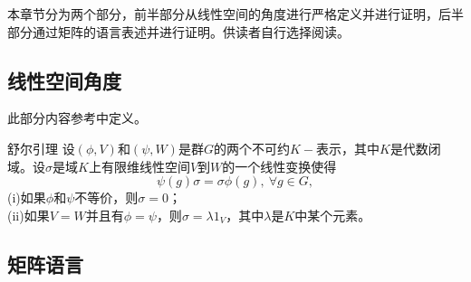 
\begin{issues}
\issueDraft
\issueNeedCite
\issueTODO
\issueMissDepend
\end{issues}


本章节分为两个部分，前半部分从线性空间的角度进行严格定义并进行证明，后半部分通过矩阵的语言表述并进行证明。供读者自行选择阅读。

\subsection{线性空间角度}

此部分内容参考\cite{维声表示}中定义。

\begin{lemma}{舒尔引理}
设$(\phi,V)$和$(\psi,W)$是群$G$的两个不可约$K-$表示，其中$K$是代数闭域。设$\sigma$是域$K$上有限维线性空间$V$到$W$的一个线性变换使得
\begin{equation}\label{eq_Schlem_1}
\psi(g)\sigma =\sigma \phi(g),~\forall g \in G,
\end{equation}
(i)如果$\phi$和$\psi$不等价，则$\sigma=0$； \\
(ii)如果$V=W$并且有$\phi=\psi$，则$\sigma=\lambda1_V$，其中$\lambda$是$K$中某个元素。
\end{lemma}







\subsection{矩阵语言}

